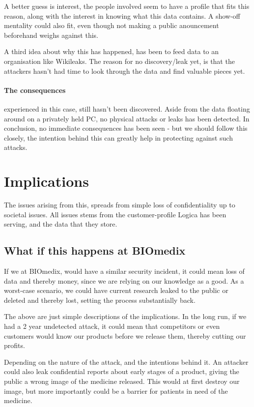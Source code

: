 \documentclass[paper=a4, fontsize=11pt]{scrartcl} %
\numberwithin{equation}{section} %
\numberwithin{figure}{section} %
\numberwithin{table}{section} %
\begin{document}
A better guess is interest, the people involved seem to have a profile that
fits this reason, along with the interest in knowing what this data contains. A
show-off mentality could also fit, even though not making a public anouncement
beforehand weighs against this.

A third idea about why this has happened, has been to feed data to an
organisation like Wikileaks. The reason for no discovery/leak yet, is that the
attackers hasn't had time to look through the data and find valuable pieces
yet.

\paragraph{The consequences} experienced in this case, still hasn't been 
discovered. Aside from the data floating around on a privately held PC, no 
physical attacks or leaks has been detected. In conclusion, no immediate
consequences has been seen - but we should follow this closely, the intention
behind this can greatly help in protecting against such attacks.

\section{Implications}
The issues arising from this, spreads from simple loss of confidentiality up to
societal issues. All issues stems from the customer-profile Logica has been
serving, and the data that they store.

\subsection{What if this happens at BIOmedix}
If we at BIOmedix, would have a similar security incident, it could mean loss
of data and thereby money, since we are relying on our knowledge as a good. As
a worst-case scenario, we could have current research leaked to the public or
deleted and thereby lost, setting the process substantially back.

The above are just simple descriptions of the implications. In the long run, if
we had a 2 year undetected attack, it could mean that competitors or even
customers would know our products before we release them, thereby cutting our
profits.

Depending on the nature of the attack, and the intentions behind it. An
attacker could also leak confidential reports about early stages of a product,
giving the public a wrong image of the medicine released. This would at first
destroy our image, but more importantly could be a barrier for patients in need
of the medicine.
\end{document}
